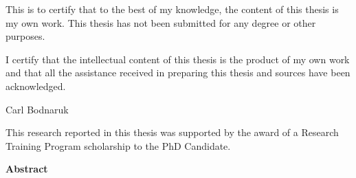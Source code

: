 \begin{center}
This is to certify that to the best of my knowledge, the content of this thesis is my own work. This thesis has not been submitted for any degree or other purposes.

I certify that the intellectual content of this thesis is the product of my own work and that all the assistance received in preparing this thesis and sources have been acknowledged.

\vspace{3cm}
Carl Bodnaruk

\vspace{10cm}
This research reported in this thesis was supported by the award of a Research Training Program scholarship to the PhD Candidate.

\end{center}
\newpage
\begin{center}
    \large
    \textbf{Abstract}
\end{center}
